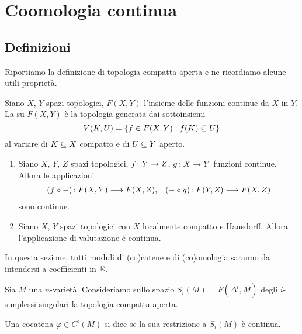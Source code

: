 \section{Coomologia continua}

\subsection{Definizioni}

Riportiamo la definizione di topologia compatta-aperta e ne ricordiamo alcune utili proprietà.

\begin{definition}
Siano $X$, $Y$ spazi topologici, $F(X,Y)$ l'insieme delle funzioni continue da $X$ in $Y$. La  su $F(X,Y)$ è la topologia generata dai sottoinsiemi
\[
V(K,U)=\{f\in F(X,Y): f(K)\subseteq U\}
\]
al variare di $K\subseteq X$ compatto e di $U\subseteq Y$ aperto.
\end{definition}

\begin{lemma}
\begin{enumerate}
\item Siano $X$, $Y$, $Z$ spazi topologici, $\map{f}{Y}{Z}$, $\map{g}{X}{Y}$ funzioni continue. Allora le applicazioni
\begin{align*}
\map{(f\circ{-})}{F(X,Y)}{F(X,Z)},&&\map{({-}\circ g)}{F(Y,Z)}{F(X,Z)}
\end{align*}
sono continue.
\item Siano $X$, $Y$ spazi topologici con $X$ localmente compatto e Hausdorff. Allora l'applicazione di valutazione
è continua.
\end{enumerate}
\end{lemma}

In questa sezione, tutti moduli di (co)catene e di (co)omologia saranno da intendersi a coefficienti in $\mathbb{R}$. 

Sia $M$ una $n$-varietà. Consideriamo sullo spazio $S_i(M)=F(\Delta^i,M)$ degli $i$-simplessi singolari la topologia compatta aperta.

\begin{definition}
Una cocatena $\varphi\in C^i(M)$ si dice  se la sua restrizione a $S_i(M)$ è continua.
\end{definition}

